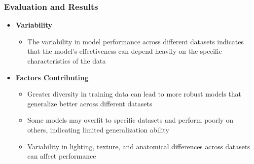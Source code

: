 \documentclass[aspectratio=169, lecture, amberg]{OTHAWbeamer}
\begin{document}
\begin{frame}
    \frametitle{Evaluation and Results}
    \vspace{0.2cm}
    \begin{itemize}
        \item <1-> \textbf{Variability }
        \vspace{0.2cm}
        \begin{itemize}
            \item The variability in model performance across different datasets indicates that the model's effectiveness can depend heavily on the specific characteristics of the data
            \vspace{0.2cm}
        \end{itemize}
        \item <2-> \textbf{Factors Contributing}
        \vspace{0.2cm}
        \begin{itemize}
            \item  Greater diversity in training data can lead to more robust models that generalize better across different datasets
            \vspace{0.2cm}
            \item  Some models may overfit to specific datasets and perform poorly on others, indicating limited generalization ability
            \vspace{0.2cm}
            \item  Variability in lighting, texture, and anatomical differences across datasets can affect performance
        \end{itemize}
    \end{itemize}
    
\end{frame}
\end{document}
